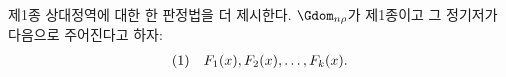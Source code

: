 
제1종 상대정역에 대한 한 판정법을 더 제시한다. $\Gdom_{n\rho}$가 제1종이고 그 정기저가 다음으로 주어진다고 하자:
\[
\begin{array}{@{}l@{\quad}c@{}}
(1)& F_1(x),F_2(x),\ldots,F_k(x).
\end{array}
\]
